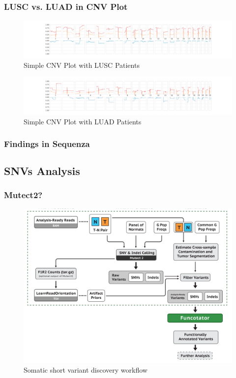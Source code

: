 \documentclass{beamer}
\begin{document}
    \begin{frame}
        \frametitle{LUSC vs. LUAD in CNV Plot}

        \begin{figure}
            \includegraphics[width=\linewidth]{figures/Sequenza/BWA-simple-SQC.pdf}
            \caption{Simple CNV Plot with LUSC Patients}
        \end{figure}

        \begin{figure}
            \includegraphics[width=\linewidth]{figures/Sequenza/BWA-simple-ADC.pdf}
            \caption{Simple CNV Plot with LUAD Patients}
        \end{figure}
    \end{frame}

    \begin{frame}
        \frametitle{Findings in Sequenza}
    \end{frame}

    \subsection{SNVs Analysis}
    \begin{frame}
        \frametitle{Mutect2?}

        \begin{figure}
            \includegraphics[width=0.6 \linewidth]{figures/Workflow/somatic_short_variants.png}
            \caption{Somatic short variant discovery workflow \protect\cite{gatk1, gatk2}}
        \end{figure}
    \end{frame}
\end{document}
